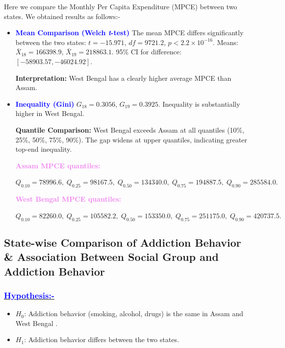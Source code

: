 Here we compare the Monthly Per Capita Expenditure (MPCE) between two states. We obtained results as follows:-
\begin{itemize}

    \item \textbf{\textcolor{blue}{Mean Comparison (Welch \emph{t}-test)}}  
    The mean MPCE differs significantly between the two states:  
    $t=-15.971$, $df=9721.2$, $p<2.2\times10^{-16}$.  
    Means: $\bar{X}_{18}=166398.9$, $\bar{X}_{19}=218863.1$.  
    95\% CI for difference: $[-58903.57, -46024.92]$.

     \textbf{Interpretation:}  
    West Bengal has a clearly higher average MPCE than Assam.

    \item \textbf{\textcolor{blue}{Inequality (Gini)}}  
    $G_{18}=0.3056$, \; $G_{19}=0.3925$.  
    Inequality is substantially higher in West Bengal.

     \textbf{Quantile Comparison:}  
    West Bengal exceeds Assam at all quantiles (10\%, 25\%, 50\%, 75\%, 90\%).  
    The gap widens at upper quantiles, indicating greater top-end inequality.

\textbf{\textcolor{violet}{Assam MPCE quantiles:}}
    
    \(
    Q_{0.10}=78996.6,\;
    Q_{0.25}=98167.5,\;
    Q_{0.50}=134340.0,\;
    Q_{0.75}=194887.5,\;
    Q_{0.90}=285584.0.
    \)

    \textbf{\textcolor{violet}{West Bengal MPCE quantiles:}}
    
    \(
    Q_{0.10}=82260.0,\;
    Q_{0.25}=105582.2,\;
    Q_{0.50}=153350.0,\;
    Q_{0.75}=251175.0,\;
    Q_{0.90}=420737.5.
    \)

\end{itemize}

\subsection{\textbf{\textcolor{deepgreen}{\large{State-wise Comparison of Addiction Behavior \& Association Between Social Group and Addiction Behavior}}}}


\subsubsection{\underline{\textbf{\textcolor{blue}{Hypothesis:-}}}}
\begin{itemize}
    \item $H_0$: Addiction behavior (smoking, alcohol, drugs) is the same in Assam and West Bengal .
    \item $H_1$: Addiction behavior differs between the two states.
\end{itemize}

